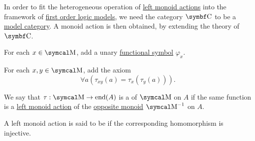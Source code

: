 \begin{remark}\label{remark:theory_of_left_monoid_actions}
  In order to fit the heterogeneous operation of \hyperref[def:left_monoid_action]{left monoid actions} into the framework of \hyperref[def:first_order_model]{first order logic models}, we need the category \( \Cat{C} \) to be a \hyperref[def:first_order_model_category]{model category}. A monoid action is then obtained, by extending the theory of \( \Cat{C} \).

  \begin{RemEnum}
     For each \( x \in \CM \), add a unary \hyperref[def:first_order_logic_language/func]{functional symbol} \( \varphi_x \).

     For each \( x, y \in \CM \), add the axiom
    \begin{equation}\label{eq:remark:theory_of_left_monoid_actions/axiom_schema}
      \forall a (\tau_{xy}(a) = \tau_x(\tau_y(a))).
    \end{equation}
  \end{RemEnum}
\end{remark}

\begin{definition}\label{def:right_monoid_action}
  We say that \( \tau: \CM \to \End(A) \) is a  of \( \CM \) on \( A \) if the same function is a \hyperref[def:left_monoid_action]{left monoid action} of the \hyperref[def:magma/opposite]{opposite monoid} \( \CM^{-1} \) on \( A \).
\end{definition}

\begin{definition}\label{def:faithful_left_monoid_action}
  A left monoid action is said to be  if the corresponding homomorphism is injective.
\end{definition}

